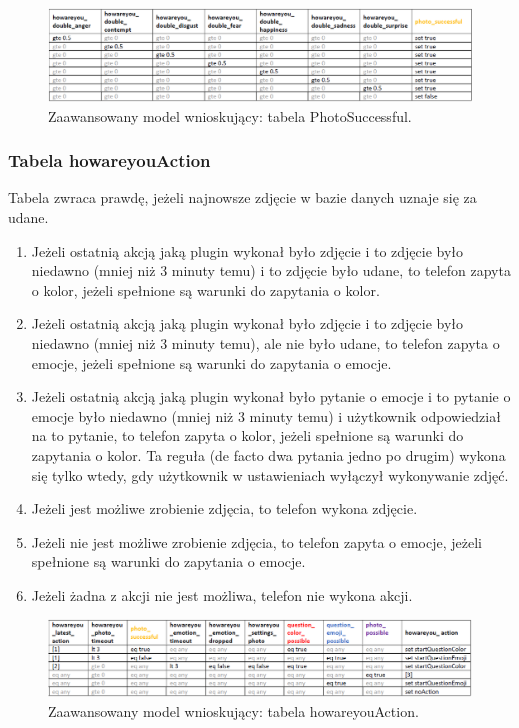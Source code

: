 \begin{figure}[H]
\centering
\includegraphics[scale=0.8]{rozdzial4/HMR_PhotoSuccessful.png}
\caption{Zaawansowany model wnioskujący: tabela PhotoSuccessful.}
\end{figure}


\subsubsection{Tabela howareyouAction}

Tabela zwraca prawdę, jeżeli najnowsze zdjęcie w bazie danych uznaje się za udane. 
\begin{enumerate}
\item Jeżeli ostatnią akcją jaką plugin wykonał było zdjęcie i to zdjęcie było niedawno (mniej niż 3 minuty temu) i to zdjęcie było udane, to telefon zapyta o kolor, jeżeli spełnione są warunki do zapytania o kolor.
\item Jeżeli ostatnią akcją jaką plugin wykonał było zdjęcie i to zdjęcie było niedawno (mniej niż 3 minuty temu), ale nie było udane, to telefon zapyta o emocje, jeżeli spełnione są warunki do zapytania o emocje.
\item Jeżeli ostatnią akcją jaką plugin wykonał było pytanie o emocje i to pytanie o emocje było niedawno (mniej niż 3 minuty temu) i użytkownik odpowiedział na to pytanie, to telefon zapyta o kolor, jeżeli spełnione są warunki do zapytania o kolor. Ta reguła (de facto dwa pytania jedno po drugim) wykona się tylko wtedy, gdy użytkownik w ustawieniach wyłączył wykonywanie zdjęć. 
\item Jeżeli jest możliwe zrobienie zdjęcia, to telefon wykona zdjęcie. 
\item Jeżeli nie jest możliwe zrobienie zdjęcia, to telefon zapyta o emocje, jeżeli spełnione są warunki do zapytania o emocje.
\item Jeżeli żadna z akcji nie jest możliwa, telefon nie wykona akcji.
\end{enumerate}

\begin{figure}[H]
\centering
\includegraphics[scale=0.8]{rozdzial4/HMR_howareyouAction.png}
\caption{Zaawansowany model wnioskujący: tabela howareyouAction.}
\end{figure}



